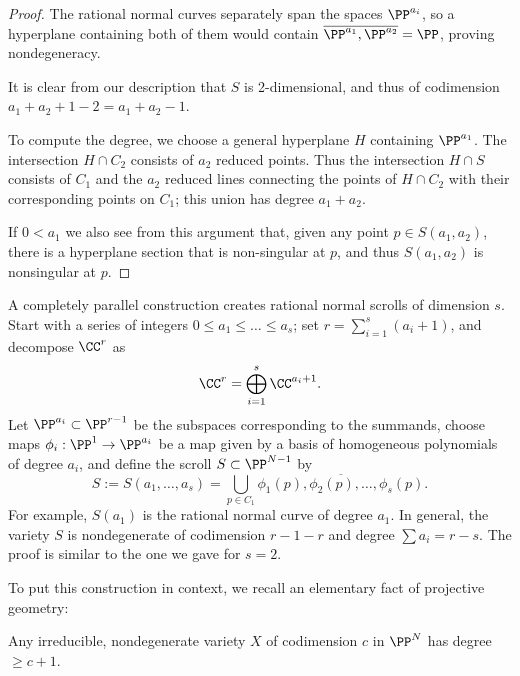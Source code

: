 \begin{proof}
 The rational normal curves separately span the spaces $\PP^{a_i}$, so a hyperplane containing both of them would contain $\overline{\PP^{a_1}, \PP^{a_{2}}} = \PP$, proving nondegeneracy. 
 
 It is clear from our description that $S$ is 2-dimensional, and thus of
codimension $a_{1}+a_{2}+1 -2 = a_{1}+a_{2}-1$. 

To compute the degree, we choose a general hyperplane $H$ containing $\PP^{a_{1}}$. The intersection $H\cap C_{2}$ consists of $a_{2}$ reduced points. Thus the intersection $H\cap S$ consists of $C_{1}$ and the $a_{2}$ reduced lines connecting 
the points of $H\cap C_{2}$ with their corresponding points on $C_{1}$; this union has degree $a_{1}+a_{2}$.

If $0< a_{1}$ we also see from this argument that, given any point  $p\in S(a_{1},a_{2})$, there is
a hyperplane section that is non-singular at $p$, and thus $S(a_{1},a_{2})$ is nonsingular at $p$.
\end{proof}

A completely parallel construction creates rational normal scrolls of dimension $s$. Start with a series of integers $0 \leq a_1 \leq \dots \leq a_s$;
set $r = \sum_{i=1}^{s}(a_{i}+1)$,  and
decompose $\CC^{r}$ as
$$
\CC^{r} = \bigoplus_{i=1}^{s}\CC^{a_{i}+1}.
$$
Let $\PP^{a_{i}}\subset \PP^{r-1}$ be the subspaces corresponding to the summands,  choose
maps $\phi_i : \PP^1 \to \PP^{a_{i}}$ be a map given by a basis of homogeneous polynomials of degree $a_i$, and define the scroll $S \subset \PP^{N-1}$ by
$$
S:=S(a_{1}, \dots, a_{s}) = \bigcup_{p\in C_{1}}\overline{\phi_1(p), \phi_{2}(p), \dots, \phi_{s}(p)}.
$$
For example, $S(a_{1})$ is the rational normal curve of degree $a_{1}$. In general, the variety $S$ is nondegenerate of codimension $r-1-r$ and degree $\sum a_{i} = r-s$. The proof is similar to the one we gave for $s=2$.


To put this construction in context, we recall an elementary fact of projective geometry:
 
\begin{proposition}\label{minimal degree}
 Any irreducible, nondegenerate variety $X$ of codimension $c$ in $\PP^{N}$ has degree $\geq c +1$.
\end{proposition}

